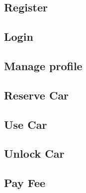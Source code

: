 \subsection{Register}


\subsection{Login}


\subsection{Manage profile}


\subsection{Reserve Car}


\subsection{Use Car}


\subsection{Unlock Car} \label{unlock_car_section}


\subsection{Pay Fee}
